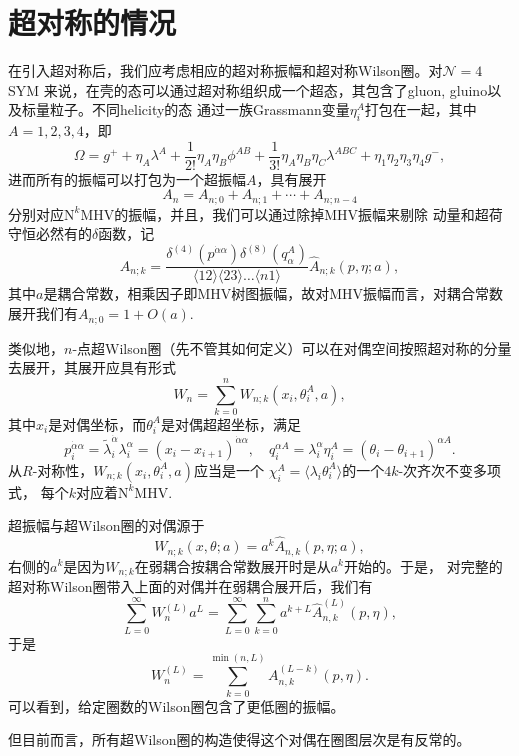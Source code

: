 \documentclass[10pt]{article}
\begin{document}
\section{超对称的情况}

在引入超对称后，我们应考虑相应的超对称振幅和超对称Wilson圈。对$\mathcal N=4$ SYM
来说，在壳的态可以通过超对称组织成一个超态，其包含了gluon, gluino以及标量粒子。不同helicity的态
通过一族Grassmann变量$\eta_i^A$打包在一起，其中$A=1,2,3,4$，即
\[
	\Omega=g^{+}+\eta_A \lambda^A+\frac{1}{2 !} \eta_A \eta_B \phi^{A B}+\frac{1}{3 !} \eta_A \eta_B \eta_C \lambda^{A B C}+\eta_1 \eta_2 \eta_3 \eta_4 g^{-},
\]
进而所有的振幅可以打包为一个超振幅$A$，具有展开
\[
	A_n=A_{n;0}+A_{n;1}+\cdots+A_{n;n-4}
\]
分别对应$\text{N}^k\text{MHV}$的振幅，并且，我们可以通过除掉MHV振幅来剔除
动量和超荷守恒必然有的$\delta$函数，记
\[
	A_{n;k}=\frac{\delta^{(4)}(p^{\dot{\alpha} \alpha}) \delta^{(8)}(q_\alpha^A)}{\langle 12\rangle\langle 23\rangle \ldots\langle n 1\rangle} \widehat{A}_{n ; k}(p, \eta ; a),
\]
其中$a$是耦合常数，相乘因子即MHV树图振幅，故对MHV振幅而言，对耦合常数展开我们有$A_{n;0}=1+O(a)$.


类似地，$n$-点超Wilson圈（先不管其如何定义）可以在对偶空间按照超对称的分量去展开，其展开应具有形式
\[
	W_n=\sum_{k=0}^n W_{n;k}(x_i,\theta_i^A,a),
\]
其中$x_i$是对偶坐标，而$\theta_i^A$是对偶超超坐标，满足
\[
p_i^{\dot{\alpha} \alpha}=\widetilde{\lambda}_i^{\dot{\alpha}} \lambda_i^\alpha=\left(x_i-x_{i+1}\right)^{\dot{\alpha} \alpha}, \quad q_i^{\alpha A}=\lambda_i^\alpha \eta_i^A=\left(\theta_i-\theta_{i+1}\right)^{\alpha A}.
\]
从$R$-对称性，$W_{n;k}(x_i,\theta_i^A,a)$应当是一个
$\chi_i^A=\langle \lambda_i\theta_i^A\rangle$的一个$4k$-次齐次不变多项式，
每个$k$对应着$\text{N}^k\text{MHV}$.

超振幅与超Wilson圈的对偶源于
\[
	W_{n;k}(x,\theta;a)=a^k \widehat A_{n,k}(p,\eta;a),
\]
右侧的$a^k$是因为$W_{n;k}$在弱耦合按耦合常数展开时是从$a^k$开始的。于是，
对完整的超对称Wilson圈带入上面的对偶并在弱耦合展开后，我们有
\[
	\sum_{L=0}^\infty W_n^{(L)}a^L=\sum_{L=0}^\infty\sum_{k=0}^n a^{k+L}\widehat A_{n,k}^{(L)}(p,\eta),
\]
于是
\[
	W_n^{(L)}=\sum_{k=0}^{\min(n,L)} A_{n,k}^{(L-k)}(p,\eta).
\]
可以看到，给定圈数的Wilson圈包含了更低圈的振幅。

但目前而言，所有超Wilson圈的构造使得这个对偶在圈图层次是有反常的。
\end{document}
